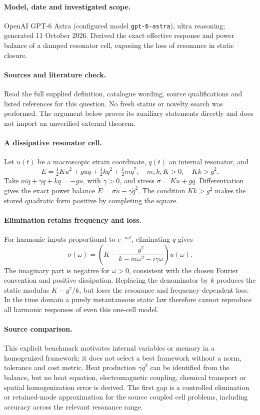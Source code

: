 \documentclass[11pt]{article}
\begin{document}
\paragraph{Model, date and investigated scope.}
OpenAI GPT-6 Astra (configured model \texttt{gpt-6-astra}), ultra reasoning; generated 11 October 2026. Derived the exact effective response and power balance of a damped resonator cell, exposing the loss of resonance in static closure.

\paragraph{Sources and literature check.}
Read the full supplied definition, catalogue wording, source qualifications and listed references for this question. No fresh status or novelty search was performed. The argument below proves its auxiliary statements directly and does not import an unverified external theorem.

\paragraph{A dissipative resonator cell.} Let \(u(t)\) be a macroscopic strain coordinate, \(q(t)\) an internal resonator, and
\[
 E=\tfrac12K u^2+g u q+\tfrac12kq^2+\tfrac12m\dot q^2,
 \quad m,k,K>0,\quad Kk>g^2.
\]
Take \(m\ddot q+\gamma\dot q+kq=-gu\), with \(\gamma>0\), and stress \(\sigma=Ku+gq\). Differentiation gives the exact power balance \(\dot E=\sigma\dot u-\gamma\dot q^2\). The condition \(Kk>g^2\) makes the stored quadratic form positive by completing the square.
\paragraph{Elimination retains frequency and loss.} For harmonic inputs proportional to \(e^{-i\omega t}\), eliminating \(q\) gives
\[
 \sigma(\omega)=\left(K-\frac{g^2}{k-m\omega^2-i\gamma\omega}\right)u(\omega).
\]
The imaginary part is negative for \(\omega>0\), consistent with the chosen Fourier convention and positive dissipation. Replacing the denominator by \(k\) produces the static modulus \(K-g^2/k\), but loses the resonance and frequency-dependent loss. In the time domain a purely instantaneous static law therefore cannot reproduce all harmonic responses of even this one-cell model.
\paragraph{Source comparison.} This explicit benchmark motivates internal variables or memory in a homogenized framework; it does not select a best framework without a norm, tolerance and cost metric. Heat production \(\gamma\dot q^2\) can be identified from the balance, but no heat equation, electromagnetic coupling, chemical transport or spatial homogenization error is derived. The first gap is a controlled elimination or retained-mode approximation for the source coupled cell problems, including accuracy across the relevant resonance range.
\end{document}
